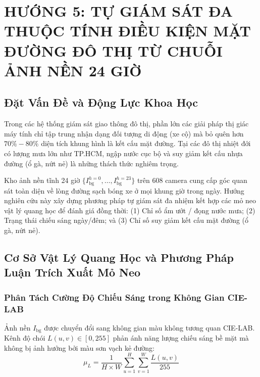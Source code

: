 \documentclass[11pt,a4paper]{article}
\begin{document}
\section{HƯỚNG 5: TỰ GIÁM SÁT ĐA THUỘC TÍNH ĐIỀU KIỆN MẶT ĐƯỜNG ĐÔ THỊ TỪ CHUỖI ẢNH NỀN 24 GIỜ}

\subsection{Đặt Vấn Đề và Động Lực Khoa Học}
Trong các hệ thống giám sát giao thông đô thị, phần lớn các giải pháp thị giác máy tính chỉ tập trung nhận dạng đối tượng di động (xe cộ) mà bỏ quên hơn $70\% - 80\%$ diện tích khung hình là kết cấu mặt đường. Tại các đô thị nhiệt đới có lượng mưa lớn như TP.HCM, ngập nước cục bộ và suy giảm kết cấu nhựa đường (ổ gà, nứt nẻ) là những thách thức nghiêm trọng.

Kho ảnh nền tĩnh 24 giờ $\{I_{\text{bg}}^{h=0}, \dots, I_{\text{bg}}^{h=23}\}$ trên 608 camera cung cấp góc quan sát toàn diện về lòng đường sạch bóng xe ở mọi khung giờ trong ngày. Hướng nghiên cứu này xây dựng phương pháp tự giám sát đa nhiệm kết hợp các mỏ neo vật lý quang học để đánh giá đồng thời: (1) Chỉ số ẩm ướt / đọng nước mưa; (2) Trạng thái chiếu sáng ngày/đêm; và (3) Chỉ số suy giảm kết cấu mặt đường (ổ gà, nứt nẻ).

\subsection{Cơ Sở Vật Lý Quang Học và Phương Pháp Luận Trích Xuất Mỏ Neo}

\subsubsection{Phân Tách Cường Độ Chiếu Sáng trong Không Gian CIE-LAB}
Ảnh nền $I_{\text{bg}}$ được chuyển đổi sang không gian màu không tương quan CIE-LAB. Kênh độ chói $L(u, v) \in [0, 255]$ phản ánh năng lượng chiếu sáng bề mặt mà không bị ảnh hưởng bởi màu sơn vạch kẻ đường:
\begin{equation}
    \mu_L = \frac{1}{H \times W} \sum_{u=1}^H \sum_{v=1}^W \frac{L(u, v)}{255}
\end{equation}
\end{document}
